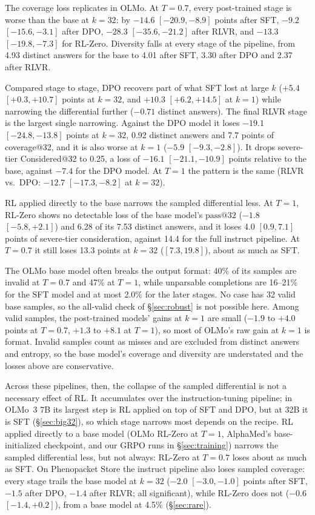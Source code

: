 \documentclass[wcp]{jmlr}
\makeatletter
\newcommand{\passk}[1]{\mathrm{pass@}#1}
\makeatother
\begin{document}
The coverage loss replicates in OLMo. At $T{=}0.7$, every post-trained stage is worse than the base at $k{=}32$: by $-14.6$ $[-20.9,-8.9]$ points after SFT, $-9.2$ $[-15.6,-3.1]$ after DPO, $-28.3$ $[-35.6,-21.2]$ after RLVR, and $-13.3$ $[-19.8,-7.3]$ for RL-Zero. Diversity falls at every stage of the pipeline, from 4.93 distinct answers for the base to 4.01 after SFT, 3.30 after DPO and 2.37 after RLVR.

Compared stage to stage, DPO recovers part of what SFT lost at large $k$ ($+5.4$ $[+0.3,+10.7]$ points at $k{=}32$, and $+10.3$ $[+6.2,+14.5]$ at $k{=}1$) while narrowing the differential further ($-0.71$ distinct answers).
The final RLVR stage is the largest single narrowing. Against the DPO model it loses $-19.1$ $[-24.8,-13.8]$ points at $k{=}32$, 0.92 distinct answers and 7.7 points of coverage@32, and it is also worse at $k{=}1$ ($-5.9$ $[-9.3,-2.8]$). It drops severe-tier Considered@32 to 0.25, a loss of $-16.1$ $[-21.1,-10.9]$ points relative to the base, against $-7.4$ for the DPO model. At $T{=}1$ the pattern is the same (RLVR vs.\ DPO: $-12.7$ $[-17.3,-8.2]$ at $k{=}32$).

RL applied directly to the base narrows the sampled differential less. At $T{=}1$, RL-Zero shows no detectable loss of the base model's $\passk{32}$ ($-1.8$ $[-5.8,+2.1]$) and 6.28 of its 7.53 distinct answers, and it loses 4.0 $[0.9,7.1]$ points of severe-tier consideration, against 14.4 for the full instruct pipeline. At $T{=}0.7$ it still loses 13.3 points at $k{=}32$ ($[7.3,19.8]$), about as much as SFT.

The OLMo base model often breaks the output format: 40\% of its samples are invalid at $T{=}0.7$ and 47\% at $T{=}1$, while unparsable completions are 16--21\% for the SFT model and at most 2.0\% for the later stages. No case has 32 valid base samples, so the all-valid check of \S\ref{sec:robust} is not possible here. Among valid samples, the post-trained models' gains at $k{=}1$ are small ($-1.9$ to $+4.0$ points at $T{=}0.7$, $+1.3$ to $+8.1$ at $T{=}1$), so most of OLMo's raw gain at $k{=}1$ is format. Invalid samples count as misses and are excluded from distinct answers and entropy, so the base model's coverage and diversity are understated and the losses above are conservative.

Across these pipelines, then, the collapse of the sampled differential is not a necessary effect of RL. It accumulates over the instruction-tuning pipeline; in OLMo~3 7B its largest step is RL applied on top of SFT and DPO, but at 32B it is SFT (\S\ref{sec:big32}), so which stage narrows most depends on the recipe. RL applied directly to a base model (OLMo RL-Zero at $T{=}1$, AlphaMed's base-initialized checkpoint, and our GRPO runs in \S\ref{sec:training}) narrows the sampled differential less, but not always: RL-Zero at $T{=}0.7$ loses about as much as SFT.
On Phenopacket Store the instruct pipeline also loses sampled coverage: every stage trails the base model at $k{=}32$ ($-2.0$ $[-3.0,-1.0]$ points after SFT, $-1.5$ after DPO, $-1.4$ after RLVR; all significant), while RL-Zero does not ($-0.6$ $[-1.4,+0.2]$), from a base model at 4.5\% (\S\ref{sec:rare}).
\end{document}
